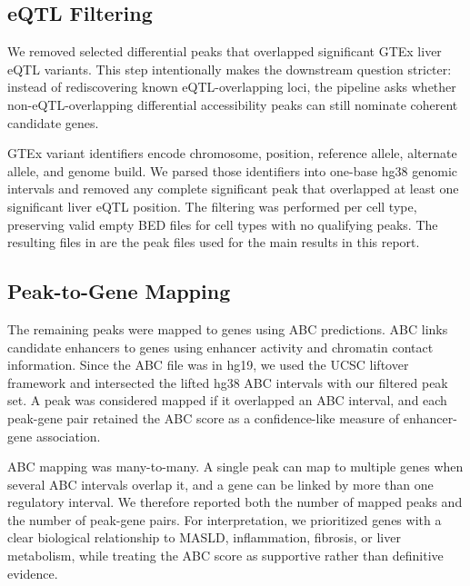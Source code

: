 \documentclass[11pt]{article}
\begin{document}
  \subsection{eQTL Filtering}\label{subsec:eqtl-filtering}
  We removed selected differential peaks that overlapped significant GTEx liver eQTL variants.
  This step intentionally makes the downstream question stricter: instead of rediscovering known eQTL-overlapping loci, the pipeline asks whether non-eQTL-overlapping differential accessibility peaks can still nominate coherent candidate genes.

  GTEx variant identifiers encode chromosome, position, reference allele, alternate allele, and genome build.
  We parsed those identifiers into one-base hg38 genomic intervals and removed any complete significant peak that overlapped at least one significant liver eQTL position.
  The filtering was performed per cell type, preserving valid empty BED files for cell types with no qualifying peaks.
  The resulting files in \href{https://github.com/noam-kimhi/Comp-Genomics-Hackathon/tree/main/data/derived/significant_peaks/filtered_significant_peaks}{} are the peak files used for the main results in this report.

  \subsection{Peak-to-Gene Mapping}\label{subsec:peak-to-gene-mapping}
  The remaining peaks were mapped to genes using ABC predictions.
  ABC links candidate enhancers to genes using enhancer activity and chromatin contact information\cite{Fulco2019ABC}.
  Since the ABC file was in hg19, we used the UCSC liftover framework\cite{Kent2002UCSC} and intersected the lifted hg38 ABC intervals with our filtered peak set.
  A peak was considered mapped if it overlapped an ABC interval, and each peak-gene pair retained the ABC score as a confidence-like measure of enhancer-gene association.

  ABC mapping was many-to-many.
  A single peak can map to multiple genes when several ABC intervals overlap it, and a gene can be linked by more than one regulatory interval.
  We therefore reported both the number of mapped peaks and the number of peak-gene pairs.
  For interpretation, we prioritized genes with a clear biological relationship to MASLD, inflammation, fibrosis, or liver metabolism, while treating the ABC score as supportive rather than definitive evidence.
\end{document}
